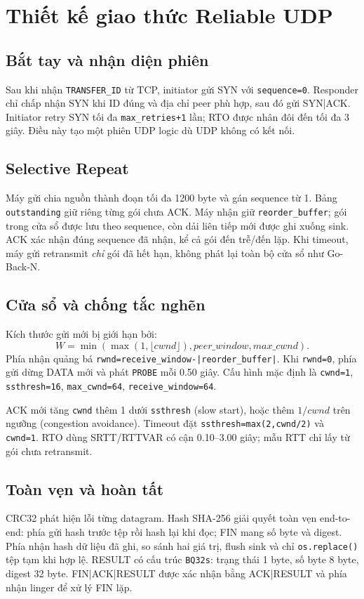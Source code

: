 \section{Thiết kế giao thức Reliable UDP}

\subsection{Bắt tay và nhận diện phiên}
Sau khi nhận \texttt{TRANSFER\_ID} từ TCP, initiator gửi SYN với \texttt{sequence=0}. 
Responder chỉ chấp nhận SYN khi ID đúng và địa chỉ peer phù hợp, sau đó gửi SYN|ACK. 
Initiator retry SYN tối đa \texttt{max\_retries+1} lần; RTO được nhân đôi đến tối đa 3 giây. 
Điều này tạo một phiên UDP logic dù UDP không có kết nối.

\subsection{Selective Repeat}
Máy gửi chia nguồn thành đoạn tối đa 1200 byte và gán sequence từ 1. 
Bảng \texttt{outstanding} giữ riêng từng gói chưa ACK. 
Máy nhận giữ \texttt{reorder\_buffer}; gói trong cửa sổ được lưu theo sequence, còn dải liên tiếp mới được ghi xuống sink. 
ACK xác nhận đúng sequence đã nhận, kể cả gói đến trễ/đến lặp. Khi timeout, máy gửi retransmit \emph{chỉ} gói đã hết hạn, không phát lại toàn bộ cửa sổ như Go-Back-N.

\subsection{Cửa sổ và chống tắc nghẽn}
Kích thước gửi mới bị giới hạn bởi:
\[
W=\min(\max(1,\lfloor cwnd\rfloor), peer\_window, max\_cwnd).
\]
Phía nhận quảng bá \texttt{rwnd=receive\_window-|reorder\_buffer|}. 
Khi \texttt{rwnd=0}, phía gửi dừng DATA mới và phát \texttt{PROBE} mỗi 0.50 giây. 
Cấu hình mặc định là \texttt{cwnd=1}, \texttt{ssthresh=16}, \texttt{max\_cwnd=64}, \texttt{receive\_window=64}.

ACK mới tăng \texttt{cwnd} thêm 1 dưới \texttt{ssthresh} (slow start), hoặc thêm $1/cwnd$ trên ngưỡng (congestion avoidance). 
Timeout đặt \texttt{ssthresh=max(2,cwnd/2)} và \texttt{cwnd=1}. 
RTO dùng SRTT/RTTVAR có cận 0.10--3.00 giây; mẫu RTT chỉ lấy từ gói chưa retransmit.

\subsection{Toàn vẹn và hoàn tất}
CRC32 phát hiện lỗi từng datagram. 
Hash SHA-256 giải quyết toàn vẹn end-to-end: phía gửi hash trước tệp rồi hash lại khi đọc; FIN mang số byte và digest. 
Phía nhận hash dữ liệu đã ghi, so sánh hai giá trị, flush sink và chỉ \texttt{os.replace()} tệp tạm khi hợp lệ. 
RESULT có cấu trúc \texttt{BQ32s}: trạng thái 1 byte, số byte 8 byte, digest 32 byte. 
FIN|ACK|RESULT được xác nhận bằng ACK|RESULT và phía nhận linger để xử lý FIN lặp.

